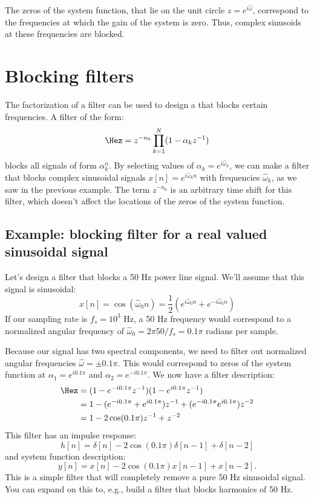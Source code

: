 The zeros of the system function, that lie on the unit circle $z=e^{i\hat{\omega}}$, correspond to the frequencies at which the gain of the system is zero. Thus, complex sinusoids at these frequencies are blocked. 


\section{Blocking filters}

The factorization of a filter can be used to design a  that blocks certain frequencies. A filter of the
form:
\begin{equation}
  \Hez = z^{-n_0}\prod_{k=1}^{N} (1-\alpha_k z^{-1})
  \label{eq:blocking_filter}
\end{equation}
blocks all signals of form $\alpha_k^n$. By selecting values of
$\alpha_k = e^{i\hat{\omega}_k}$, we can make a filter that blocks
complex sinusoidal signals $x[n]=e^{i\hat{\omega}_k n}$ with
frequencies $\hat{\omega}_k$, as we saw in the previous example. The
term $z^{-n_0}$ is an arbitrary time shift for this filter, which
doesn't affect the locations of the zeros of the system function.

\subsection{Example: blocking filter for a real valued sinusoidal signal}

Let's design a filter that blocks a 50 Hz power line signal. We'll assume that this signal is sinusoidal:
\begin{equation}
  x[n]=\cos(\hat{\omega}_0 n) = \frac{1}{2}(e^{i\hat{\omega}_0 n}+e^{-i\hat{\omega}_0 n})
\end{equation}
If our sampling rate is $f_s=10^3$ Hz, a 50 Hz frequency would
correspond to a normalized angular frequency of $\hat{\omega}_0=2\pi
50/f_s = 0.1\pi$ radians per sample.

Because our signal has two spectral components, we need to filter out
normalized angular frequencies $\hat{\omega}=\pm 0.1\pi$. This would
correspond to zeros of the system function at $\alpha_1=e^{i0.1\pi}$
and $\alpha_2=e^{-i0.1\pi}$. We now have a filter description:
\begin{align}
\Hez & = (1-e^{-i 0.1 \pi} z^{-1})(1-e^{i 0.1 \pi} z^{-1}) \\
     &= 1 - (e^{-i0.1\pi} + e^{i0.1\pi})z^{-1} + (e^{-i0.1\pi} e^{i0.1\pi})z^{-2}\\
      &=1 - 2\cos(0.1\pi)z^{-1} + z^{-2}
\end{align}
This filter has an impulse response:
\begin{equation}
h[n] = \delta[n] -2\cos(0.1\pi)\delta[n-1] + \delta[n-2]
\end{equation}
and system function description:
\begin{equation}
y[n] = x[n] - 2\cos(0.1\pi)x[n-1]+x[n-2].
\end{equation}
This is a simple filter that will completely remove a pure 50 Hz
sinusoidal signal. You can expand on this to, e.g., build a filter that
blocks harmonics of 50 Hz.



